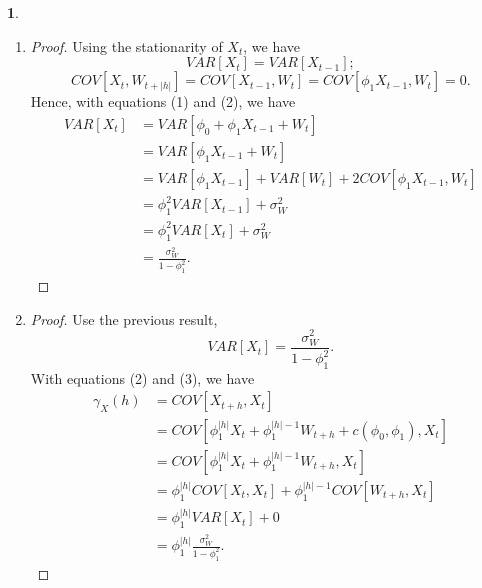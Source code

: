 \documentclass[10pt]{article}
\newtheorem{bonus}{\bm{$Bonus\;Problem$}}
\begin{document}
\begin{bonus}
\end{bonus}
\begin{enumerate}[1)]
\vspace{3mm}

\item
\begin{proof}
Using the stationarity of $X_t$, we have
\begin{equation}
VAR[X_t]=VAR[X_{t-1}];
\end{equation}
\begin{equation}
COV[X_t,W_{t+|h|}]=COV[X_{t-1},W_t]=COV[\phi_1X_{t-1},W_t]=0. %
\end{equation}
Hence, with equations (1) and (2), we have
\begin{align*}
VAR[X_t]&=VAR[\phi_0+\phi_1X_{t-1}+W_t]\\
&=VAR[\phi_1X_{t-1}+W_t]\\
&=VAR[\phi_1X_{t-1}]+VAR[W_t]+2COV[\phi_1X_{t-1},W_t]\\
&=\phi^2_1VAR[X_{t-1}]+\sigma^2_W\\
&=\phi^2_1VAR[X_t]+\sigma^2_W\\
&=\frac{\sigma^2_W}{1-\phi^2_1}.
\end{align*}
\end{proof}
\vspace{3mm}

\item
\begin{proof}
Use the previous result,
\begin{equation}
VAR[X_t]=\frac{\sigma^2_W}{1-\phi^2_1}.
\end{equation}
With equations (2) and (3), we have
\begin{align*}
\gamma_X(h)&=COV[X_{t+h},X_t]\\
&=COV[\phi^{|h|}_1X_t+\phi^{|h|-1}_1W_{t+h}+c(\phi_0,\phi_1),X_t]\\
&=COV[\phi^{|h|}_1X_t+\phi^{|h|-1}_1W_{t+h},X_t]\\
&=\phi^{|h|}_1COV[X_t,X_t]+\phi^{|h|-1}_1COV[W_{t+h},X_t]\\
&=\phi^{|h|}_1VAR[X_t]+0\\
&=\phi^{|h|}_1\frac{\sigma^2_W}{1-\phi^2_1}.
\end{align*}
\end{proof}

\end{enumerate}
\end{document}
